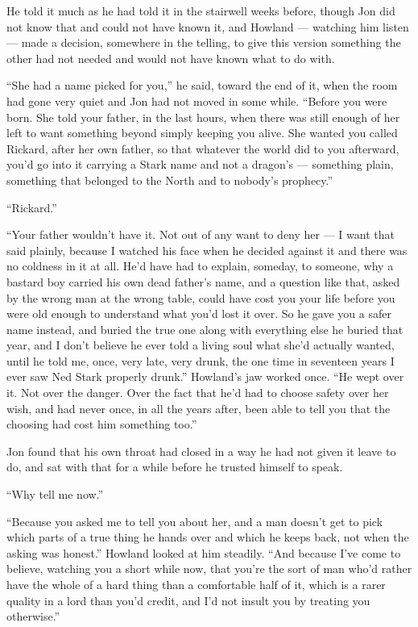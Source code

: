 \sceneBreak

He told it much as he had told it in the stairwell weeks before, though Jon did not know that and could not have known it, and Howland — watching him listen — made a decision, somewhere in the telling, to give this version something the other had not needed and would not have known what to do with.

“She had a name picked for you,” he said, toward the end of it, when the room had gone very quiet and Jon had not moved in some while. “Before you were born. She told your father, in the last hours, when there was still enough of her left to want something beyond simply keeping you alive. She wanted you called Rickard, after her own father, so that whatever the world did to you afterward, you’d go into it carrying a Stark name and not a dragon’s — something plain, something that belonged to the North and to nobody’s prophecy.”

“Rickard.”

“Your father wouldn’t have it. Not out of any want to deny her — I want that said plainly, because I watched his face when he decided against it and there was no coldness in it at all. He’d have had to explain, someday, to someone, why a bastard boy carried his own dead father’s name, and a question like that, asked by the wrong man at the wrong table, could have cost you your life before you were old enough to understand what you’d lost it over. So he gave you a safer name instead, and buried the true one along with everything else he buried that year, and I don’t believe he ever told a living soul what she’d actually wanted, until he told me, once, very late, very drunk, the one time in seventeen years I ever saw Ned Stark properly drunk.” Howland’s jaw worked once. “He wept over it. Not over the danger. Over the fact that he’d had to choose safety over her wish, and had never once, in all the years after, been able to tell you that the choosing had cost him something too.”

Jon found that his own throat had closed in a way he had not given it leave to do, and sat with that for a while before he trusted himself to speak.

“Why tell me now.”

“Because you asked me to tell you about her, and a man doesn’t get to pick which parts of a true thing he hands over and which he keeps back, not when the asking was honest.” Howland looked at him steadily. “And because I’ve come to believe, watching you a short while now, that you’re the sort of man who’d rather have the whole of a hard thing than a comfortable half of it, which is a rarer quality in a lord than you’d credit, and I’d not insult you by treating you otherwise.”

